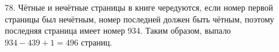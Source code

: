 78. Чётные и нечётные страницы в книге чередуются, если номер первой страницы был нечётным, номер последней должен быть чётным, поэтому последняя страница имеет номер 934. Таким образом, выпало $934-439+1=496$ страниц.\\
